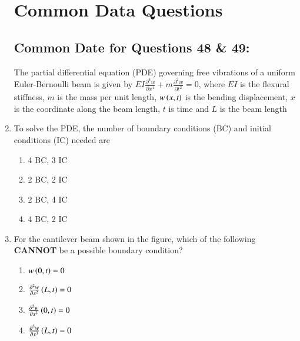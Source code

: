 \documentclass[journal]{IEEEtran}
\begin{document}
\begin{enumerate}
\section*{Common Data Questions}
\subsection*{Common Date for Questions 48 \& 49:}
The partial differential equation (PDE) governing free vibrations of a uniform Euler-Bernoulli beam is given by $EI \frac{\partial^4 w}{\partial x^4} + m \frac{\partial^2 w}{\partial t^2} = 0$, where $EI$ is the flexural stiffness, $m$ is the mass per unit length, $w\left(x,t\right)$ is the bending displacement, $x$ is the coordinate along the beam length, $t$ is time and $L$ is the beam length

\item To solve the PDE, the number of boundary conditions (BC) and initial conditions (IC) needed are
\begin{multicols}{2}
    \begin{enumerate}
        \item 4 BC, 3 IC
        \item 2 BC, 2 IC
        \item 2 BC, 4 IC
        \item 4 BC, 2 IC
    \end{enumerate}
\end{multicols}
\item For the cantilever beam shown in the figure, which of the following \textbf{CANNOT} be a possible boundary condition?
\begin{multicols}{2}
    \begin{enumerate}
        \item $w\left(0,t\right) = 0$
        \item $\frac{\partial^2 w}{\partial x^2} \left(L,t\right) = 0$
        \item $\frac{\partial^2 w}{\partial x^2} \left(0,t\right) = 0$
        \item $\frac{\partial^3 w}{\partial x^3} \left(L,t\right) = 0$
    \end{enumerate}
\end{multicols}


\end{enumerate}
\end{document}
